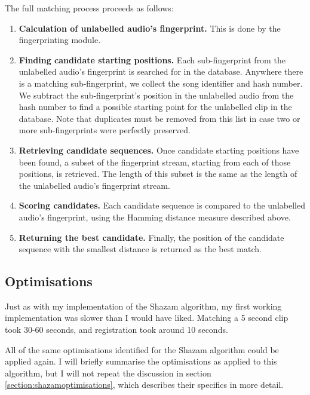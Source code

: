 \documentclass[12pt,a4paper,twoside,openright]{report}
\begin{document}
The full matching process proceeds as follows:

\begin{enumerate}

  \item \textbf{Calculation of unlabelled audio's fingerprint.} This is done by the fingerprinting module.

  \item \textbf{Finding candidate starting positions.} Each sub-fingerprint from the unlabelled audio's fingerprint is searched for in the database. Anywhere there is a matching sub-fingerprint, we collect the song identifier and hash number. We subtract the sub-fingerprint's position in the unlabelled audio from the hash number to find a possible starting point for the unlabelled clip in the database. Note that duplicates must be removed from this list in case two or more sub-fingerprints were perfectly preserved.

  \item \textbf{Retrieving candidate sequences.} Once candidate starting positions have been found, a subset of the fingerprint stream, starting from each of those positions, is retrieved. The length of this subset is the same as the length of the unlabelled audio's fingerprint stream.

  \item \textbf{Scoring candidates.} Each candidate sequence is compared to the unlabelled audio's fingerprint, using the Hamming distance measure described above.

  \item \textbf{Returning the best candidate.} Finally, the position of the candidate sequence with the smallest distance is returned as the best match.

\end{enumerate}

\subsection{Optimisations}

Just as with my implementation of the Shazam algorithm, my first working implementation was slower than I would have liked. Matching a 5 second clip took 30-60 seconds, and registration took around 10 seconds. 

All of the same optimisations identified for the Shazam algorithm could be applied again. I will briefly summarise the optimisations as applied to this algorithm, but I will not repeat the discussion in section \ref{section:shazamoptimisations}, which describes their specifics in more detail.
\end{document}
